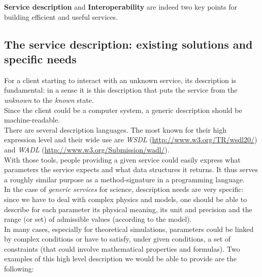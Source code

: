 \documentclass[a4paper,11pt] {ivoa}
\begin{document}
{\bf Service description} and {\bf Interoperability} are indeed two key points for building
efficient and useful services.

\subsection{The service description: existing solutions and specific needs}
For a client starting to interact with an unknown service, its description is fundamental: in a
sense it is this description that puts the service from the {\it unknown} to the {\it known}
state.\\
Since the client could be a computer system, a generic description should be machine-readable.\\

There are several description languages. The most known for their high expression level and their
wide use are \emph{WSDL} (\href{http://www.w3.org/TR/wsdl20/}{http://www.w3.org/TR/wsdl20/}) and
\textit{WADL} (\href{http://www.w3.org/Submission/wadl/}{http://www.w3.org/Submission/wadl/}).\\
With those tools, people providing a given service could easily express what parameters the service
expects and what data structures it returns. It thus serves a roughly similar purpose as a
method-signature in a programming language.\\

In the case of {\it generic services} for science, description needs are very specific: since we
have to deal with complex physics and models, one should be able to describe for each parameter its
physical meaning, its unit and precision and the range (or set) of admissible values (according to
the model).\\ 

In many cases, especially for theoretical simulations, parameters could be linked by
complex conditions or have to satisfy, under given conditions, a set of constraints (that could
involve mathematical properties and formulas).
Two examples of this high level description we would be able to provide are the following:
\end{document}
